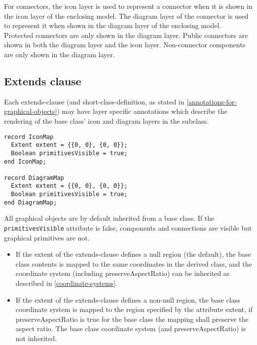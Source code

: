 For connectors, the icon layer is used to represent a connector when it
is shown in the icon layer of the enclosing model. The diagram layer of
the connector is used to represent it when shown in the diagram layer of
the enclosing model. Protected connectors are only shown in the diagram
layer. Public connectors are shown in both the diagram layer and the
icon layer. Non-connector components are only shown in the diagram
layer.

\subsection{Extends clause}

Each extends-clause (and short-class-definition, as stated in \autoref{annotations-for-graphical-objects})
may have layer specific annotations which describe
the rendering of the base class' icon and diagram layers in the
subclass.

\begin{lstlisting}[language=modelica]
record IconMap
  Extent extent = {{0, 0}, {0, 0}};
  Boolean primitivesVisible = true;
end IconMap;

record DiagramMap
  Extent extent = {{0, 0}, {0, 0}};
  Boolean primitivesVisible = true;
end DiagramMap;
\end{lstlisting}
All graphical objects are by default inherited from a base class. If the
\lstinline!primitivesVisible! attribute is false, components and connections are
visible but graphical primitives are not.

\begin{itemize}
\item
  If the extent of the extends-clause defines a null region (the
  default), the base class contents is mapped to the same coordinates in
  the derived class, and the coordinate system (including
  preserveAspectRatio) can be inherited as described in
  \autoref{coordinate-systems}.
\item
  If the extent of the extends-clause defines a non-null region, the
  base class coordinate system is mapped to the region specified by the
  attribute extent, if preserveAspectRatio is true for the base class
  the mapping shall preserve the aspect ratio. The base class coordinate
  system (and preserveAspectRatio) is not inherited.
\end{itemize}

